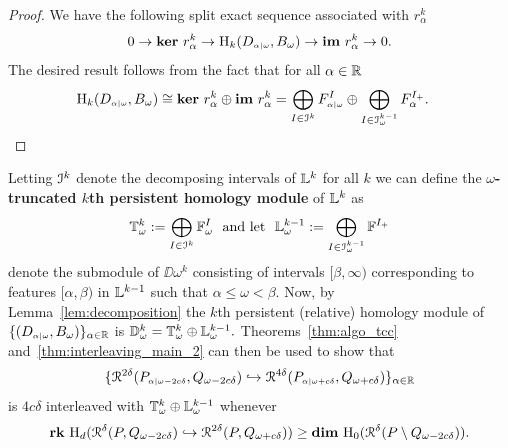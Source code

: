 \begin{proof}
  We have the following split exact sequence associated with $r_\alpha^k$
  \[ 0\to \mathbf{ker}~r_\alpha^k\to \mathrm{H}_k(D_{\scriptscriptstyle \alpha\mid \omega}, B_\omega)\to\mathbf{im}~r_\alpha^k\to 0.\]
  The desired result follows from the fact that for all $\alpha\in\mathbb{R}$
  \begin{align*}
    \mathrm{H}_k(D_{\scriptscriptstyle \alpha\mid \omega}, B_\omega) &\cong \mathbf{ker}~r_\alpha^k\oplus \mathbf{im}~r_\alpha^k =\bigoplus_{I\in{\mathcal{I}}^k} F_{\scriptscriptstyle \alpha\mid \omega}^I\oplus \bigoplus_{I\in{\mathcal{I}}_\omega^{k-1}} F_\alpha^{I_+}.
  \end{align*}
\end{proof}

Letting ${\mathcal{I}}^k$ denote the decomposing intervals of $\mathbb{L}^k$ for all $k$ we can define the \textbf{$\omega$-truncated $k$th persistent homology module} of $\mathbb{L}^k$ as
\[ \T_\omega^k := \bigoplus_{I\in\I^k} \FF_\omega^I\ \text{ and let }\ \LL_\omega^{k-1} := \bigoplus_{I\in \I_\omega^{k-1}} \FF^{I_+}\]
denote the submodule of $\DD{\omega}^k$ consisting of intervals $[\beta,\infty)$ corresponding to features $[\alpha,\beta)$ in $\mathbb{L}^{k-1}$ such that $\alpha\leq\omega <\beta$.
Now, by Lemma~\ref{lem:decomposition} the $k$th persistent (relative) homology module of $\{(D_{\scriptscriptstyle \alpha\mid \omega}, B_\omega)\}_{\alpha\in\mathbb{R}}$ is $\mathbb{D}_{\omega}^k = \mathbb{T}_\omega^k\oplus \mathbb{L}_\omega^{k-1}.$
Theorems~\ref{thm:algo_tcc} and~\ref{thm:interleaving_main_2} can then be used to show that
\[ \{\mathcal{R}^{2\delta}(P_{\scriptscriptstyle \alpha\mid \omega-2c\delta}, Q_{\omega-2c\delta})\hookrightarrow \mathcal{R}^{4\delta}(P_{\scriptscriptstyle \alpha\mid \omega+c\delta}, Q_{\omega+c\delta})\}_{\alpha\in\mathbb{R}} \]
is $4c\delta$ interleaved with $\mathbb{T}_\omega^k\oplus \mathbb{L}_\omega^{k-1}$ whenever
\[ \mathbf{rk}~\mathrm{H}_d(\mathcal{R}^\delta(P, Q_{\omega - 2c\delta})\hookrightarrow \mathcal{R}^{2\delta}(P, Q_{\omega+c\delta})) \geq \mathbf{dim}~\mathrm{H}_0(\mathcal{R}^\delta(P\setminus Q_{\omega-2c\delta})).\]
